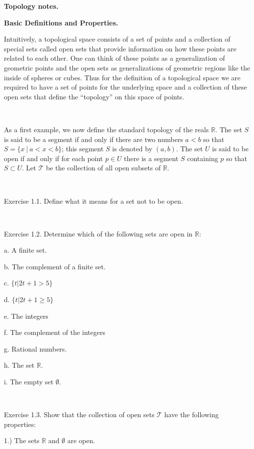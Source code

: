 \documentclass[12pt, std]{article}
\begin{document}
\begin{center} \textbf{Topology notes.} 

\textbf{Basic Definitions and Properties.} 
\end{center}

Intuitively, a topological space consists of a set of points and a
collection of special sets called open sets that provide information
on how these points are related to each other.  One can think of
these points as  a generalization of geometric points and the open
sets as generalizations of geometric regions like the inside of
spheres or cubes.  Thus for the definition of a topological space we
are required to have a set of points for the underlying space and a
collection of these open sets that define the ``topology'' on this
space of points.

\

As a first example, we now define the standard topology of the reals $\mathbb{R}$.  The set $S$ is said to be a segment if and only if there are two numbers $a<b$ so that $S = \{ x \ | \ a<x<b \}$; this segment $S$ is denoted by $(a,b)$.
The set $U$ is said to be open if and only if for each point $p \in
U$ there is a segment $S$ containing $p$ so that $S \subset U$. Let
$\mathcal{T}$ be the collection of all open subsets of $\mathbb{R}$.

\

Exercise 1.1.  Define what it means for a set not to be open.

\

Exercise 1.2.  Determine which of the following sets are open in
$\mathbb{R}$:

\qquad a.  A finite set.

\qquad b.  The complement of a finite set.

\qquad c.  $\{ t | 2t + 1 > 5 \}$

\qquad d.  $\{ t | 2t + 1 \ge 5 \}$

\qquad e.  The integers

\qquad f.  The complement of the integers

\qquad g.  Rational numbers.

\qquad h. The set $\mathbb{R}$.

\qquad i. The empty set $\emptyset$.


\

Exercise 1.3.  Show that the collection of open sets $\mathcal{T}$
have the following properties:

1.) The sets $\mathbb{R}$ and $\emptyset$ are open.
\end{document}
